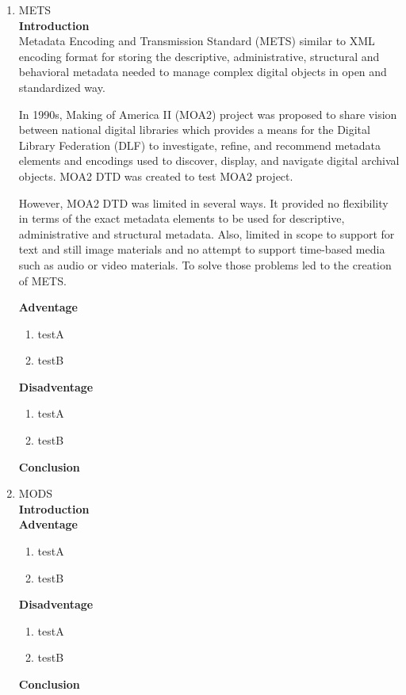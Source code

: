 \begin{enumerate}
	\item METS\\
	{\bf Introduction}\\
	Metadata Encoding and Transmission Standard (METS) similar to XML encoding format for storing the descriptive, administrative, structural and behavioral metadata needed to manage complex digital objects in open and standardized way.
	
	In 1990s, Making of America II (MOA2) project was proposed to share vision between national digital libraries which provides a means for the Digital Library Federation (DLF) to investigate, refine, and recommend metadata elements and encodings used to discover, display, and navigate digital archival objects. MOA2 DTD was created to test MOA2 project.
	
	However, MOA2 DTD was limited in several ways. It provided no flexibility in terms of the exact metadata elements to be used for descriptive, administrative and structural metadata. Also, limited in scope to support for text and still image materials and no attempt to support time-based media such as audio or video materials. To solve those problems led to the creation of METS.
	
	{\bf Adventage}
	\begin{enumerate}
		\item testA
		\item testB
	\end{enumerate}	
	{\bf Disadventage}
	\begin{enumerate}
		\item testA
		\item testB
	\end{enumerate}
	{\bf Conclusion}\\	
	
	\item MODS\\
	{\bf Introduction}\\
	
	{\bf Adventage}
	\begin{enumerate}
		\item testA
		\item testB
	\end{enumerate}	
	{\bf Disadventage}
	\begin{enumerate}
		\item testA
		\item testB
	\end{enumerate}
	{\bf Conclusion}\\
	

\end{enumerate}
